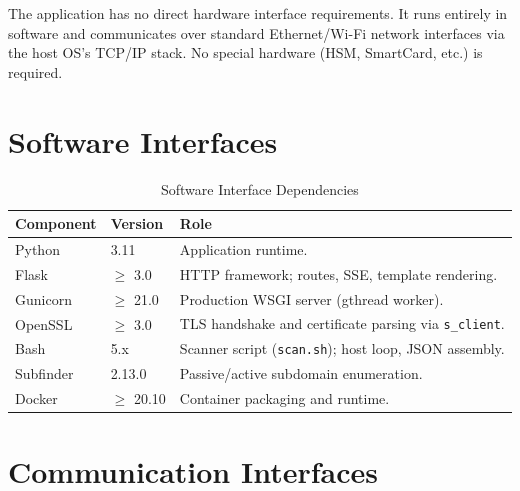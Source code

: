 The application has no direct hardware interface requirements. It runs entirely
in software and communicates over standard Ethernet/Wi-Fi network interfaces via
the host OS's TCP/IP stack. No special hardware (HSM, SmartCard, etc.) is
required.

\section{Software Interfaces}
\label{sec:software_interfaces}

\begin{table}[H]
  \centering
  \caption{Software Interface Dependencies}
  \label{tab:software_interfaces}
  \begin{tabularx}{\textwidth}{L{3cm} L{2.5cm} L{8.5cm}}
    \toprule
    \textbf{Component} & \textbf{Version} & \textbf{Role} \\
    \midrule
    Python             & 3.11             & Application runtime. \\
    Flask              & $\geq$ 3.0       & HTTP framework; routes, SSE, template rendering. \\
    Gunicorn           & $\geq$ 21.0      & Production WSGI server (gthread worker). \\
    OpenSSL            & $\geq$ 3.0       & TLS handshake and certificate parsing via
                                           \texttt{s\_client}. \\
    Bash               & 5.x              & Scanner script (\texttt{scan.sh}); host
                                           loop, JSON assembly. \\
    Subfinder          & 2.13.0           & Passive/active subdomain enumeration. \\
    Docker             & $\geq$ 20.10     & Container packaging and runtime. \\
    \bottomrule
  \end{tabularx}
\end{table}

\section{Communication Interfaces}
\label{sec:communication_interfaces}

